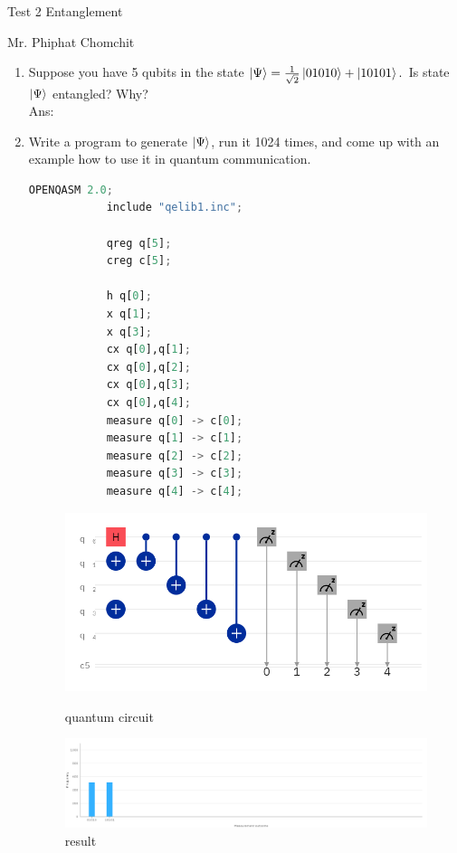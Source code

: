 \documentclass[12pt, a4paper]{article}
\begin{document}
	\begin{center}
		Test 2  Entanglement
	\end{center}
	
	Mr. Phiphat Chomchit
	\begin{enumerate}
		\item Suppose you have 5 qubits in the state  $\ket{\Psi} = \frac{1}{\sqrt{2}}\ket{01010} + \ket{10101} .$ Is state $\ket{\Psi}$ entangled? Why?\\
		
		Ans:
		
		\item Write a program to generate $\ket{\Psi}$, run it 1024 times, and come up with an example how to use it in quantum communication.
		\begin{lstlisting}[language=Python, caption=IBM Q code]
			OPENQASM 2.0;
			include "qelib1.inc";
			
			qreg q[5];
			creg c[5];
			
			h q[0];
			x q[1];
			x q[3];
			cx q[0],q[1];
			cx q[0],q[2];
			cx q[0],q[3];
			cx q[0],q[4];
			measure q[0] -> c[0];
			measure q[1] -> c[1];
			measure q[2] -> c[2];
			measure q[3] -> c[3];
			measure q[4] -> c[4];
		\end{lstlisting}
	
			\begin{figure}
				 \centering
				\includegraphics[scale=0.3]{circuit-krik226j.png}
				\caption{quantum circuit}
				\includegraphics[scale=0.2]{bar-chart.png}
				\caption{result}
			\end{figure}

		
	\end{enumerate}
\end{document}
